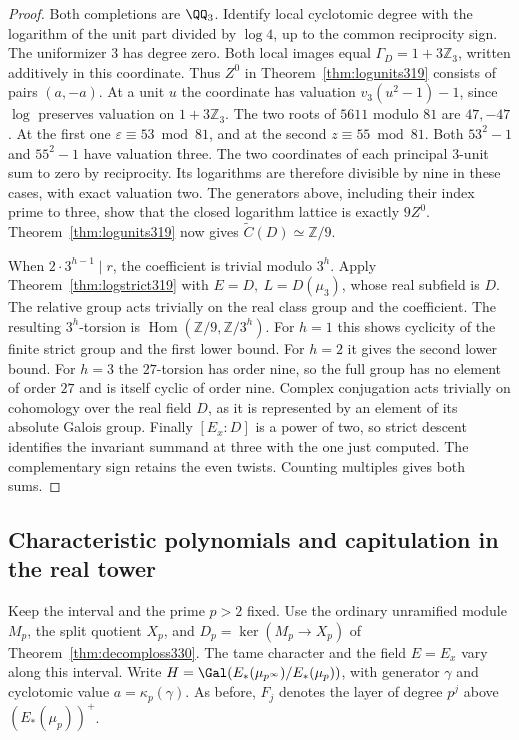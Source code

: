 \documentclass[a4paper,11pt]{article}
\theoremstyle{definition}
\theoremstyle{remark}
\newcommand{\ZZ}{\mathbb Z}\newcommand{\ord}{\operatorname{ord}}
\numberwithin{equation}{section}
\begin{document}
\begin{proof}
Both completions are \(\QQ_3\). Identify local
cyclotomic degree with the logarithm of the unit part
divided by \(\log 4\), up to the common reciprocity sign.
The uniformizer \(3\) has degree zero. Both local images
equal \(\Gamma_D=1+3\ZZ_3\), written additively in this
coordinate. Thus \(Z^0\) in Theorem~\ref{thm:logunits319}
consists of pairs \((a,-a)\). At a unit \(u\) the
coordinate has valuation \(v_3(u^2-1)-1\), since
\(\log\) preserves valuation on \(1+3\ZZ_3\).
The two roots of \(5611\) modulo \(81\) are \(47,-47\).
At the first one \(\varepsilon\equiv53\bmod81\), and
at the second \(z\equiv55\bmod81\). Both
\(53^2-1\) and \(55^2-1\) have valuation three.
The two coordinates of each principal \(3\)-unit sum
to zero by reciprocity. Its logarithms are therefore
divisible by nine in these cases, with exact valuation
two. The generators above, including their index prime
to three, show that the closed logarithm lattice is
exactly \(9Z^0\). Theorem~\ref{thm:logunits319} now gives
\(\widetilde C(D)\simeq\ZZ/9\).

When \(2\cdot3^{h-1}\mid r\), the coefficient is trivial
modulo \(3^h\). Apply Theorem~\ref{thm:logstrict319} with
\(E=D,\ L=D(\mu_3)\), whose real subfield is \(D\).
The relative group acts trivially on the real class group
and the coefficient. The resulting \(3^h\)-torsion is
\(\operatorname{Hom}(\ZZ/9,\ZZ/3^h)\). For \(h=1\)
this shows cyclicity of the finite strict group and the
first lower bound. For \(h=2\) it gives the second lower
bound. For \(h=3\) the \(27\)-torsion has order nine,
so the full group has no element of order \(27\) and is
itself cyclic of order nine. Complex conjugation acts
trivially on cohomology over the real field \(D\), as it
is represented by an element of its absolute Galois
group. Finally \([E_x:D]\) is a power of two, so strict
descent identifies the invariant summand at three with
the one just computed. The complementary sign retains
the even twists. Counting multiples gives both sums.
\end{proof}

\subsection{Characteristic polynomials and capitulation in the real tower}\label{nav:classmatrix330}
Keep the interval and the prime \(p>2\) fixed. Use the ordinary
unramified module \(M_p\), the split quotient \(X_p\), and
\(D_p=\ker(M_p\to X_p)\) of Theorem~\ref{thm:decomploss330}.
The tame character and the field \(E=E_x\) vary along this interval.
Write \(H=\Gal(E_*(\mu_{p^\infty})/E_*(\mu_p))\), with generator
\(\gamma\) and cyclotomic value \(a=\kappa_p(\gamma)\). As before,
\(F_j\) denotes the layer of degree \(p^j\) above
\((E_*(\mu_p))^+\).
\end{document}
